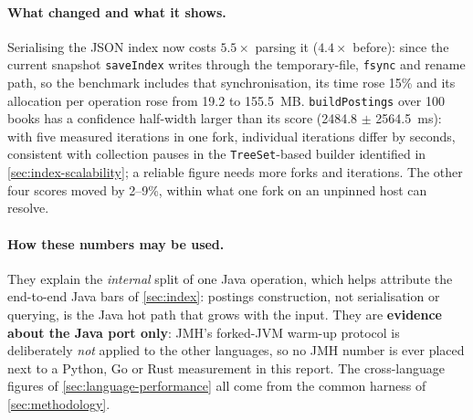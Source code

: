 \paragraph{What changed and what it shows.}
Serialising the JSON index now costs $5.5\times$ parsing it ($4.4\times$
before): since the current snapshot \texttt{saveIndex} writes through the
temporary-file, \texttt{fsync} and rename path, so the benchmark includes
that synchronisation, its time rose 15\% and its allocation per operation
rose from 19.2 to 155.5~MB. \texttt{buildPostings} over 100 books has a
confidence half-width larger than its score (2484.8 $\pm$ 2564.5~ms): with
five measured iterations in one fork, individual iterations differ by
seconds, consistent with collection pauses in the \texttt{TreeSet}-based
builder identified in \cref{sec:index-scalability}; a reliable figure needs
more forks and iterations. The other four scores moved by 2--9\%, within what
one fork on an unpinned host can resolve.

\paragraph{How these numbers may be used.}
They explain the \emph{internal} split of one Java operation, which helps
attribute the end-to-end Java bars of \cref{sec:index}: postings
construction, not serialisation or querying, is the Java hot path that grows
with the input. They are \textbf{evidence about the Java port only}: JMH's
forked-JVM warm-up protocol is deliberately \emph{not} applied to the other
languages, so no JMH number is ever placed next to a Python, Go or Rust
measurement in this report. The cross-language figures of
\cref{sec:language-performance} all come from the common harness of
\cref{sec:methodology}.
